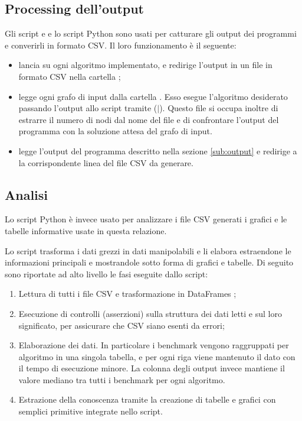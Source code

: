 \subsection{Processing dell'output}

Gli script  e  e lo script Python  sono usati per catturare gli output dei programmi e converirli in formato CSV. Il loro funzionamento è il seguente:

\begin{itemize}
    \item {} lancia  su ogni algoritmo implementato, e redirige l'output in un file in formato CSV nella cartella ;
    \item {} legge ogni grafo di input dalla cartella . Esso esegue l'algoritmo desiderato passando l'output allo script  tramite  ($\vert$). Questo file si occupa inoltre di estrarre il numero di nodi dal nome del file e di confrontare l'output del programma con la soluzione attesa del grafo di input.
    \item {} legge l'output del programma descritto nella sezione \ref{sub:output} e redirige a  la corrispondente linea del file CSV da generare.
\end{itemize}

\subsection{Analisi}

\noindent Lo script Python  è invece usato per analizzare i file CSV generati i grafici e le tabelle informative usate in questa relazione.

\noindent Lo script trasforma i dati grezzi in dati manipolabili e li
elabora estraendone le informazioni principali e mostrandole sotto
forma di grafici e tabelle. Di seguito sono riportate ad alto
livello le fasi eseguite dallo script:

\begin{enumerate}
    \item Lettura di tutti i file CSV e trasformazione in DataFrames ;
    \item Esecuzione di controlli (asserzioni) sulla struttura dei dati
      letti e sul loro significato, per assicurare che CSV siano esenti da errori;
    \item Elaborazione dei dati. In particolare i benchmark vengono raggruppati
      per algoritmo in una singola tabella, e per ogni riga
      viene mantenuto il dato con il tempo di esecuzione minore. La
      colonna degli output invece mantiene il valore mediano tra tutti
      i benchmark per ogni algoritmo.
    \item Estrazione della conoscenza tramite la creazione di tabelle
      e grafici con semplici primitive integrate nello script.
    \label{script-phase-analysis}
\end{enumerate}

